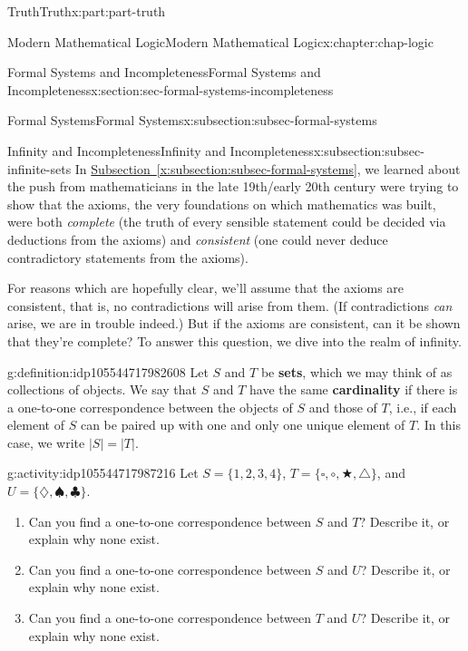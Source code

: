 \documentclass[oneside,10pt,]{book}
\newcommand{\xreffont}{\relax}
\newcommand{\terminology}[1]{\textbf{#1}}
\numberwithin{equation}{section}
\begin{document}
\begin{partptx}{Truth}{}{Truth}{}{}{x:part:part-truth}
\begin{chapterptx}{Modern Mathematical Logic}{}{Modern Mathematical Logic}{}{}{x:chapter:chap-logic}
\begin{sectionptx}{Formal Systems and Incompleteness}{}{Formal Systems and Incompleteness}{}{}{x:section:sec-formal-systems-incompleteness}
\begin{subsectionptx}{Formal Systems}{}{Formal Systems}{}{}{x:subsection:subsec-formal-systems}
\end{subsectionptx}
%
%
\typeout{************************************************}
\typeout{************************************************}
%
\begin{subsectionptx}{Infinity and Incompleteness}{}{Infinity and Incompleteness}{}{}{x:subsection:subsec-infinite-sets}
In \hyperref[x:subsection:subsec-formal-systems]{Subsection~{\xreffont\ref{x:subsection:subsec-formal-systems}}}, we learned about the push from mathematicians in the late 19th\slash{}early 20th century were trying to show that the axioms, the very foundations on which mathematics was built, were both \emph{complete} (the truth of every sensible statement could be decided via deductions from the axioms) and \emph{consistent} (one could never deduce contradictory statements from the axioms).%
\par
For reasons which are hopefully clear, we'll assume that the axioms are consistent, that is, no contradictions will arise from them. (If contradictions \emph{can} arise, we are in trouble indeed.) But if the axioms are consistent, can it be shown that they're complete? To answer this question, we dive into the realm of infinity.%
\begin{definition}{}{g:definition:idp105544717982608}%
Let \(S\) and \(T\) be \terminology{sets}, which we may think of as collections of objects. We say that \(S\) and \(T\) have the same \terminology{cardinality} if there is a one-to-one correspondence between the objects of \(S\) and those of \(T\), i.e., if each element of \(S\) can be paired up with one and only one unique element of \(T\). In this case, we write \(|S| = |T|\).%
\end{definition}
\begin{activity}{}{g:activity:idp105544717987216}%
Let \(S = \{1,2,3,4\}\), \(T=\{\square,\circ,\bigstar,\triangle\}\), and \(U = \{\diamondsuit,\spadesuit,\clubsuit\}\).%
%
\begin{enumerate}
\item{}Can you find a one-to-one correspondence between \(S\) and \(T\)? Describe it, or explain why none exist.%
\item{}Can you find a one-to-one correspondence between \(S\) and \(U\)? Describe it, or explain why none exist.%
\item{}Can you find a one-to-one correspondence between \(T\) and \(U\)? Describe it, or explain why none exist.%
\end{enumerate}
\end{activity}%

\end{subsectionptx}
\end{sectionptx}
\end{chapterptx}
\end{partptx}
\end{document}
